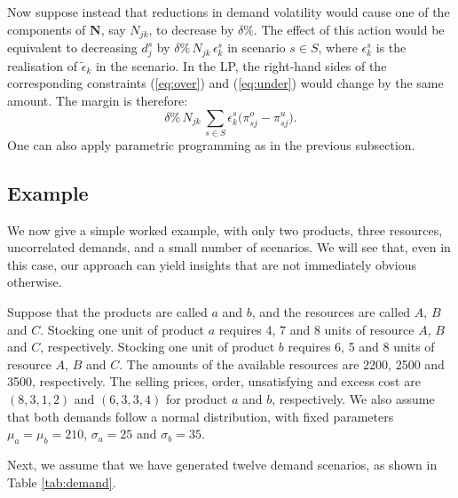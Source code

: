 \documentclass[a4paper,11pt]{article}
\begin{document}
Now suppose instead that reductions in demand volatility would cause one of the components of $\mathbf{N}$, say $N_{jk}$, to decrease by $\delta \%$. The effect of this action would be equivalent to decreasing $d_j^s$ by $\delta \% \, N_{jk} \, \epsilon_k^s$ in scenario $s \in S$, where $\epsilon_k^s$ is the realisation of $\tilde{\epsilon}_k$ in the scenario. In the LP, the right-hand sides of the corresponding constraints (\ref{eq:over}) and (\ref{eq:under}) would change by the same amount. The margin is therefore:
\[
\delta \% \, N_{jk} \, \sum_{s \in S} \epsilon_k^s \big(\pi_{sj}^o - \pi_{sj}^u \big).
\]
One can also apply parametric programming as in the previous subsection.

\subsection{Example} \label{sub:method4}

We now give a simple worked example, with only two products, three resources, uncorrelated demands, and a small number of scenarios. We will see that, even in this case, our approach can yield insights that are not immediately obvious otherwise.

Suppose that the products are called $a$ and $b$, and the resources are called $A$, $B$ and $C$. Stocking one unit of product $a$ requires 4, 7 and 8 units of resource $A$, $B$ and $C$, respectively. Stocking one unit of product $b$ requires 6, 5 and 8 units of resource $A$, $B$ and $C$. The amounts of the available resources are 2200, 2500 and 3500, respectively. The selling prices, order, unsatisfying and excess cost are $(8,3,1,2)$ and $(6,3,3,4)$ for product $a$ and $b$, respectively. We also assume that both demands follow a normal distribution, with fixed parameters $\mu_a = \mu_b =210$, $\sigma_a = 25$ and $\sigma_b = 35$.

Next, we assume that we have generated twelve demand scenarios, as shown in Table \ref{tab:demand}.

\begin{table}[htb]
\caption{Twelve possible demand realisations for two products}
\label{tab:demand}
\centering
{}
\end{table}
\end{document}
